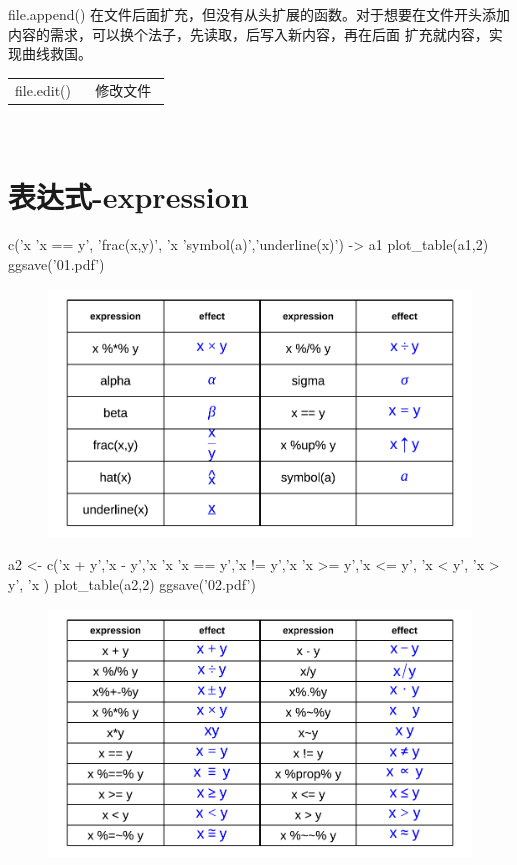 \documentclass[10 pt,landscape]{article}
\newcommand{\rcode}[2]{
   \begin{tabular}{p{0.48\linewidth} p{0.45\linewidth} }
 {\sf \textcolor{a1}{#1} }  &      #2  \\
   \end{tabular}
   \\
}
\begin{document}
\begin{multicols*}{3}
         file.append() 在文件后面扩充，但没有从头扩展的函数。对于想要在文件开头添加内容的需求，可以换个法子，先读取，后写入新内容，再在后面 扩充就内容，实现曲线救国。\\
        \rcode{file.edit()}{修改文件}
        
    \section{表达式-expression}
    \begin{R}
    c('x %
  'x == y',  'frac(x,y)',  'x %
  'symbol(a)','underline(x)') -> a1
plot_table(a1,2)
ggsave('01.pdf')
     \end{R}
      \begin{figure}[H]
      \centering
        \includegraphics[width = 1\linewidth]{01.pdf}
      \end{figure}
        
        \begin{R}
a2 <- c('x + y','x - y','x %
         'x %
        'x == y','x != y','x %
        'x >= y','x <= y',
        'x < y', 'x > y', 'x %
        )
plot_table(a2,2)
ggsave('02.pdf')
       \end{R}
          \begin{figure}[H]
      \centering
        \includegraphics[width = 1\linewidth]{02.pdf}
      \end{figure}
     

\end{multicols*}
\end{document}
